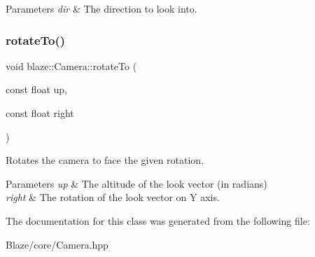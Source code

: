 \begin{DoxyParams}{Parameters}
{\em dir} & The direction to look into. \\
\hline
\end{DoxyParams}
\mbox{\label{classblaze_1_1Camera_ac8fe17f6fc1abadcfa7ec86bee4152d5}} 
\subsubsection{\texorpdfstring{rotate\+To()}{rotateTo()}}
{\footnotesize\ttfamily void blaze\+::\+Camera\+::rotate\+To (\begin{DoxyParamCaption}\item[{const float}]{up,  }\item[{const float}]{right }\end{DoxyParamCaption})\hspace{0.3cm}{\ttfamily [inline]}}



Rotates the camera to face the given rotation. 


\begin{DoxyParams}{Parameters}
{\em up} & The altitude of the look vector (in radians) \\
\hline
{\em right} & The rotation of the look vector on Y axis. \\
\hline
\end{DoxyParams}


The documentation for this class was generated from the following file\+:\begin{DoxyCompactItemize}
\item 
Blaze/core/Camera.\+hpp\end{DoxyCompactItemize}
